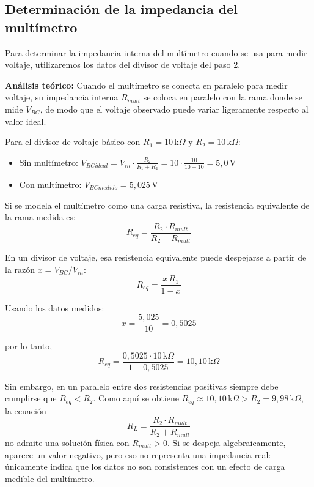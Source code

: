 \documentclass[12pt,a4paper]{article}
\begin{document}
\bigskip
\subsection{Determinación de la impedancia del multímetro}

Para determinar la impedancia interna del multímetro cuando se usa para medir voltaje, utilizaremos los datos del divisor de voltaje del paso 2.

\textbf{Análisis teórico:}
Cuando el multímetro se conecta en paralelo para medir voltaje, su impedancia interna $R_{mult}$ se coloca en paralelo con la rama donde se mide $V_{BC}$, de modo que el voltaje observado puede variar ligeramente respecto al valor ideal.

Para el divisor de voltaje básico con $R_1 = 10 \, \mathrm{k}\Omega$ y $R_2 = 10 \, \mathrm{k}\Omega$:
\begin{itemize}
    \item Sin multímetro: $V_{BCideal} = V_{in} \cdot \frac{R_2}{R_1 + R_2} = 10 \cdot \frac{10}{10 + 10} = 5{,}0 \, \mathrm{V}$
    \item Con multímetro: $V_{BCmedido} = 5{,}025 \, \mathrm{V}$
\end{itemize}

Si se modela el multímetro como una carga resistiva, la resistencia equivalente de la rama medida es:
\begin{equation}
R_{eq} = \frac{R_2 \cdot R_{mult}}{R_2 + R_{mult}}
\end{equation}

En un divisor de voltaje, esa resistencia equivalente puede despejarse a partir de la razón $x = V_{BC}/V_{in}$:
\begin{equation}
R_{eq} = \frac{x \, R_1}{1 - x}
\end{equation}

Usando los datos medidos:
\begin{equation}
x = \frac{5{,}025}{10} = 0{,}5025
\end{equation}

por lo tanto,
\begin{equation}
R_{eq} = \frac{0{,}5025 \cdot 10 \, \mathrm{k}\Omega}{1 - 0{,}5025} = 10{,}10 \, \mathrm{k}\Omega
\end{equation}

Sin embargo, en un paralelo entre dos resistencias positivas siempre debe cumplirse que $R_{eq} < R_2$. Como aquí se obtiene $R_{eq} \approx 10{,}10 \, \mathrm{k}\Omega > R_2 = 9{,}98 \, \mathrm{k}\Omega$, la ecuación
\begin{equation}
R_L = \frac{R_2 \cdot R_{mult}}{R_2 + R_{mult}}
\end{equation}
no admite una solución física con $R_{mult} > 0$. Si se despeja algebraicamente, aparece un valor negativo, pero eso no representa una impedancia real: únicamente indica que los datos no son consistentes con un efecto de carga medible del multímetro.
\end{document}
